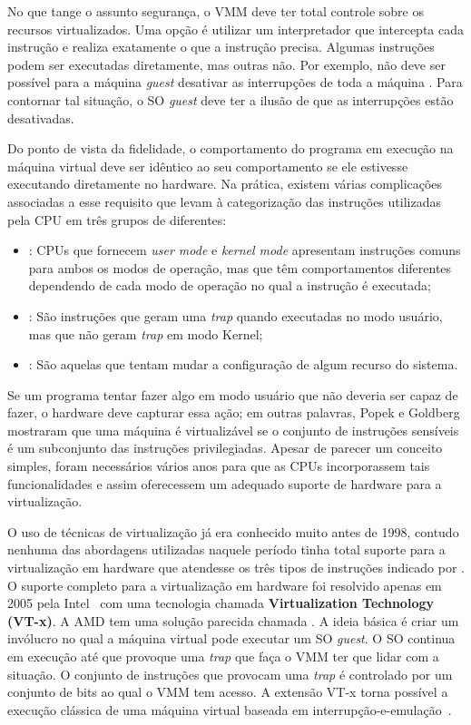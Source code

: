 No que tange o assunto segurança, o VMM deve ter total controle sobre os
recursos virtualizados. Uma opção é utilizar um interpretador que intercepta
cada instrução e realiza exatamente o que a instrução precisa. Algumas
instruções podem ser executadas diretamente, mas outras não. Por exemplo, não
deve ser possível para a máquina \emph{guest} desativar as interrupções de toda
a máquina \citep{tanenbaum}. Para contornar tal situação, o SO \emph{guest}
deve ter a ilusão de que as interrupções estão desativadas.

Do ponto de vista da fidelidade, o comportamento do programa em execução na
máquina virtual deve ser idêntico ao seu comportamento se ele estivesse executando
diretamente no hardware. Na prática, existem várias complicações associadas a
esse requisito que levam à categorização das instruções utilizadas pela CPU em
três grupos de diferentes:

\begin{itemize}
  \item {}: CPUs que fornecem \emph{user mode} e
        \emph{kernel mode} apresentam instruções comuns para ambos os modos de
        operação, mas que têm comportamentos diferentes dependendo de cada modo
        de operação no qual a instrução é executada;
  \item {}: São instruções que geram uma
        \emph{trap} quando executadas no modo usuário, mas que não geram
        \emph{trap} em modo Kernel;
  \item {}: São aquelas que
        tentam mudar a configuração de algum recurso do sistema.
\end{itemize}

Se um programa tentar fazer algo em modo usuário que não deveria ser capaz de
fazer, o hardware deve capturar essa ação; em outras palavras, Popek e Goldberg
mostraram que uma máquina é virtualizável se o conjunto de instruções sensíveis
é um subconjunto das instruções privilegiadas. Apesar de parecer um conceito
simples, foram necessários vários anos para que as CPUs incorporassem tais funcionalidades
e assim oferecessem um adequado suporte de hardware para a virtualização.

O uso de técnicas de virtualização já era conhecido muito antes de 1998,
contudo nenhuma das abordagens utilizadas naquele período tinha total suporte
para a virtualização em hardware que atendesse os três tipos de instruções
indicado por \citet{popek}. O suporte completo para a virtualização em hardware
foi resolvido apenas em 2005 pela Intel~\citep{uhlig} com uma tecnologia
chamada \textbf{Virtualization Technology (VT-x)}. A AMD tem uma
solução parecida chamada . A ideia
básica é criar um invólucro no qual a máquina virtual pode executar um SO
\emph{guest}.  O SO continua em execução até que provoque uma \emph{trap} que
faça o VMM ter que lidar com a situação. O conjunto de instruções que provocam
uma \emph{trap} é controlado por um conjunto de bits ao qual o VMM tem acesso.
A extensão VT-x torna possível a execução clássica de uma máquina virtual
baseada em interrupção-e-emulação~\citep{tanenbaum}.

